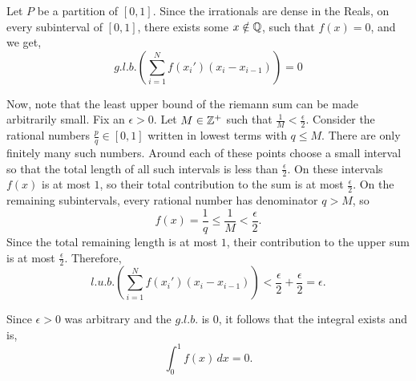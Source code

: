 \documentclass[12pt]{article}
\begin{document}
\begin{solution}
    \bbni
    
    Let $P$ be a partition of $[0,1]$. Since the irrationals are dense in the Reals, on every subinterval of $[0,1]$, there exists some $x \notin \mathbb Q$, such that $f(x) = 0$, and we get,   
    \[g.l.b.\left(\sum_{i=1}^N f(x_i')(x_i-x_{i-1})\right) = 0\]

    Now, note that the least upper bound of the riemann sum can be made arbitrarily small. Fix an $\epsilon > 0$. Let $M \in \mathbb Z^+$ such that $\frac{1}{M} < \frac{\epsilon}{2}$. 
    Consider the rational numbers $\frac{p}{q} \in [0,1]$
    written in lowest terms with $q \le M$.
    There are only finitely many such numbers.
    Around each of these points choose a small interval so that
    the total length of all such intervals is less than $\frac{\epsilon}{2}$. On these intervals $f(x)$ is at most $1$, so their total contribution to the sum is at most $\frac{\epsilon}{2}$. On the remaining subintervals, every rational number has
    denominator $q > M$, so
    \[
    f(x) = \frac{1}{q} \le \frac{1}{M} < \frac{\epsilon}{2}.
    \]
    Since the total remaining length is at most $1$,
    their contribution to the upper sum is at most $\frac{\epsilon}{2}$. Therefore,
    \[l.u.b.\left(\sum_{i=1}^N f(x_i')(x_i-x_{i-1})\right)< \frac{\epsilon}{2} + \frac{\epsilon}{2}= \epsilon.\]

    Since $\epsilon>0$ was arbitrary and the $g.l.b.$ is $0$,
    it follows that the integral exists and is,
    \[\int_0^1 f(x)\,dx = 0.\]
\end{solution}
\end{document}
